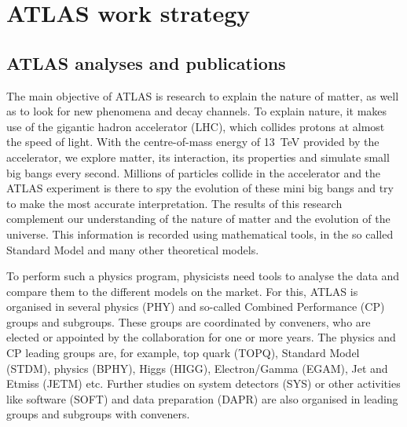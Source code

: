 
\section{ATLAS work strategy}%
\label{sec:ATLAS_work_strategy}

\subsection{ATLAS analyses and publications}%
\label{sec:The_ATLAS_Analyses_and_Publications}

The main objective of ATLAS is research to explain the nature of matter, 
as well as to look for new phenomena and decay channels.
To explain nature, it makes use of the gigantic hadron accelerator (LHC),
which collides protons at almost the speed of light.
With the centre-of-mass energy of \SI{13}{\TeV} provided by the accelerator, we explore matter, its interaction, its properties and simulate small big bangs every second.
Millions of particles collide in the accelerator and the ATLAS experiment is there to spy the evolution of these mini big bangs and try to make the most accurate interpretation.
The results of this research complement our understanding of the nature of matter and the evolution of the universe.
This information is recorded using mathematical tools, in the so called Standard Model and many other theoretical models.

To perform such a physics program, physicists need tools to analyse the data and compare them to the different models on the market.
For this, ATLAS is organised in several physics (PHY) and so-called Combined Performance (CP) groups and subgroups.
These groups are coordinated by conveners,
who are elected or appointed by the collaboration for one or more years.
The physics and CP leading groups are, for example, top quark (TOPQ), Standard Model (STDM), \PB physics (BPHY), Higgs (HIGG), Electron/Gamma (EGAM), Jet and Etmiss (JETM) etc.
Further studies on system detectors (SYS) or other activities like software (SOFT) and data preparation (DAPR) are also organised in leading groups and subgroups with conveners.

